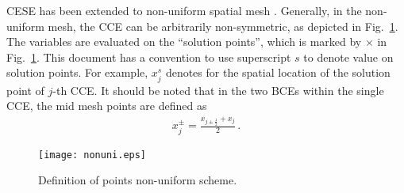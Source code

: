 \documentclass[11pt,dvips]{article}
\renewcommand{\figurename}{Fig.}
\numberwithin{equation}{section}
\begin{document}
CESE has been extended to non-uniform spatial
mesh \citep{chang_multi-dimensional_2003}.  Generally, in the non-uniform mesh,
the CCE can be arbitrarily non-symmetric, as depicted in
\figurename~\ref{f:nonuni}.  The variables are evaluated on the ``solution
points'', which is marked by $\times$ in \figurename~\ref{f:nonuni}.  This
document has a convention to use superscript $s$ to denote value on solution
points.  For example, $x_j^s$ denotes for the spatial location of the solution
point of $j$-th CCE.  It should be noted that in the two BCEs within the single
CCE, the mid mesh points are defined as
\begin{align*}
  x_j^{\pm} = \frac{x_{j\pm\frac{1}{2}} + x_j}{2}\,.
\end{align*}

\begin{figure}[htbp]
  \centering
  \texttt{[image: nonuni.eps]}
  \caption{Definition of points non-uniform scheme.}
  \label{f:nonuni}
\end{figure}
\end{document}
